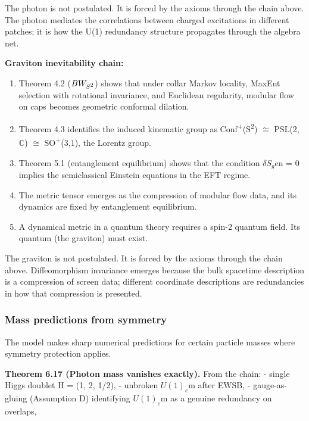 \documentclass[11pt,a4paper]{article}
\theoremstyle{remark}
\providecommand{\tightlist}{%
  \setlength{\itemsep}{0pt}\setlength{\parskip}{0pt}}
\begin{document}
The photon is not postulated. It is forced by the axioms through the chain
above. The photon mediates the correlations between charged excitations in
different patches; it is how the U(1) redundancy structure propagates through
the algebra net.

\textbf{Graviton inevitability chain:}

\begin{enumerate}
\def\labelenumi{\arabic{enumi}.}
\tightlist
\item
  Theorem 4.2 (\(BW_{S\textsuperscript{2}}\)) shows that under collar Markov locality, MaxEnt
  selection with rotational invariance, and Euclidean regularity, modular flow
  on caps becomes geometric conformal dilation.
\item
  Theorem 4.3 identifies the induced kinematic group as
  Conf\textsuperscript{+}(S\textsuperscript{2}) \ensuremath{\cong} PSL(2,\ensuremath{\mathbb{C}}) \ensuremath{\cong} SO\textsuperscript{+}(3,1), the Lorentz group.
\item
  Theorem 5.1 (entanglement equilibrium) shows that the condition
  \(\ensuremath{\delta}S_g\)en = 0 implies the semiclassical Einstein equations in the EFT regime.
\item
  The metric tensor emerges as the compression of modular flow data, and its
  dynamics are fixed by entanglement equilibrium.
\item
  A dynamical metric in a quantum theory requires a spin-2 quantum field.
  Its quantum (the graviton) must exist.
\end{enumerate}

The graviton is not postulated. It is forced by the axioms through the chain
above. Diffeomorphism invariance emerges because the bulk spacetime description
is a compression of screen data; different coordinate descriptions are
redundancies in how that compression is presented.

\subsubsection{Mass predictions from symmetry}\label{mass-predictions-from-symmetry}

The model makes sharp numerical predictions for certain particle masses
where symmetry protection applies.

\textbf{Theorem 6.17 (Photon mass vanishes exactly).} From the chain:
- single Higgs doublet H = (1, 2, 1/2),
- unbroken \(U(1)_e\)m after EWSB,
- gauge-as-gluing (Assumption D) identifying \(U(1)_e\)m as a genuine redundancy
on overlaps,
\end{document}
